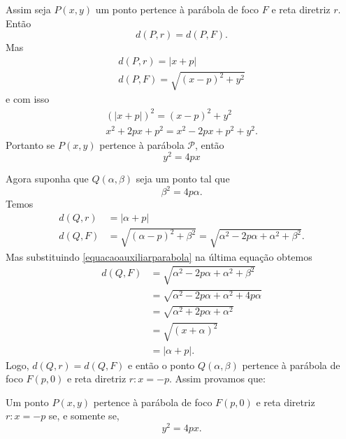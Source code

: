 Assim seja $P(x,y)$ um ponto pertence à parábola de foco $F$ e reta diretriz $r$. Então
\[
    d(P,r) = d(P,F).
\]
Mas
\begin{align*}
    d(P,r) = |x + p| \\
    d(P,F) = \sqrt{(x - p)^2 + y^2}
\end{align*}
e com isso
\begin{align*}
    (|x + p|)^2 = (x - p)^2 + y^2 \\
    x^2 + 2px + p^2 = x^2 - 2px + p^2 + y^2.
\end{align*}
Portanto se $P(x,y)$ pertence à parábola $\mathcal{P}$, então
\begin{equation}
    y^2 = 4px
\end{equation}

Agora suponha que $Q(\alpha, \beta)$ seja um ponto tal que
\begin{equation}\label{equacaoauxiliarparabola}
    \beta^2 = 4p\alpha.
\end{equation}
Temos
\begin{align*}
    d(Q, r) & = | \alpha + p|                                                                      \\
    d(Q, F) & = \sqrt{(\alpha - p)^2 + \beta^2} = \sqrt{\alpha^2 - 2p\alpha + \alpha^2 + \beta^2}.
\end{align*}
Mas substituindo \eqref{equacaoauxiliarparabola} na última equação obtemos
\begin{align*}
    d(Q, F) & = \sqrt{\alpha^2 - 2p\alpha + \alpha^2 + \beta^2} \\ &= \sqrt{\alpha^2 - 2p\alpha + \alpha^2 + 4p\alpha} \\                                                                                                                                                                  & = \sqrt{\alpha^2 + 2p\alpha +
    \alpha^2}                                                   \\ &=	\sqrt{(x + \alpha)^2} \\ &= |\alpha + p|.
\end{align*}
Logo, $d(Q, r) = d(Q, F)$ e então o ponto $Q(\alpha, \beta)$ pertence à parábola de foco $F(p,0)$ e reta diretriz $r : x = -p$. Assim provamos que:

\begin{proposicao}
    Um ponto $P(x, y)$ pertence à parábola de foco $F(p, 0)$ e reta diretriz $r : x = -p$ se, e somente se,
    \begin{equation}\label{equacaoparabola}
        y^2 = 4px.
    \end{equation}
\end{proposicao}


